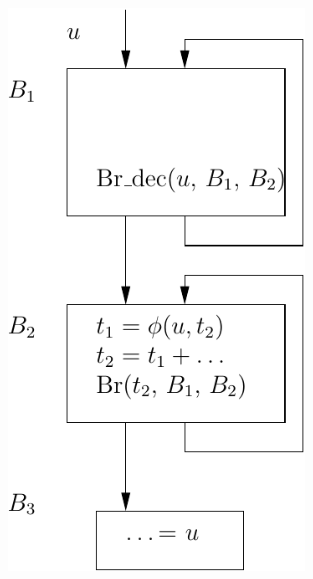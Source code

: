 \begin{figure}[t]
{\begin{minipage}{0.33\textwidth}
    \includegraphics[width=0.7\textwidth]{cexple-impossible-2}
  \end{minipage}
}
\hfill
{}
\end{figure}
